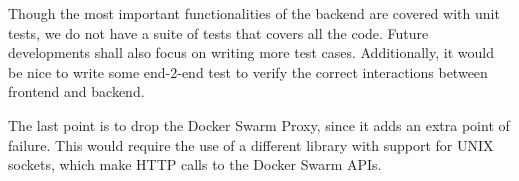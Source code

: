 Though the most important functionalities of the backend are covered with unit tests, we do not have a suite of tests that covers all the code.
Future developments shall also focus on writing more test cases. Additionally, it would be nice to write some end-2-end test to verify the correct interactions between frontend and backend.

The last point is to drop the Docker Swarm Proxy, since it adds an extra point of failure.
This would require the use of a different library with support for UNIX sockets, which make HTTP calls to the Docker Swarm APIs.
